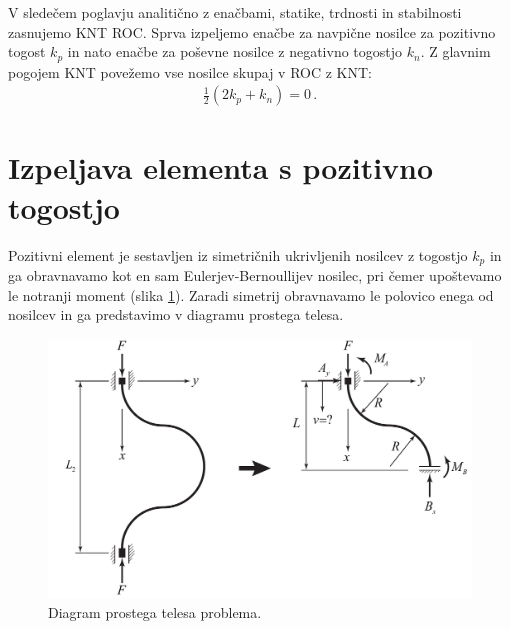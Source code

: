     V sledečem poglavju analitično z enačbami, statike, trdnosti in stabilnosti zasnujemo KNT ROC. Sprva izpeljemo enačbe za navpične nosilce za pozitivno togost $k_p$ in nato enačbe za poševne nosilce z negativno togostjo $k_n$. Z glavnim pogojem KNT  povežemo vse nosilce skupaj v ROC z KNT: 
    \begin{align}\label{eq:pogoh_KNT}
        \frac{1}{2} (2 k_p +  k_n) = 0 \,.
    \end{align}
    
    
    \newpage
    \section{Izpeljava elementa s pozitivno togostjo}\label{sec:Izpeljava_elementa_s_pozitivno_togostjo}
    
        Pozitivni element je sestavljen iz simetričnih ukrivljenih nosilcev z togostjo $k_p$ in ga obravnavamo kot en sam Eulerjev-Bernoullijev nosilec, pri čemer upoštevamo le notranji moment (slika \ref{fig:diagram prostega telesa pozitivni element}). Zaradi simetrij obravnavamo le polovico enega od nosilcev in ga predstavimo v diagramu prostega telesa.
        \begin{figure}[!hb]
                \centering
                \includegraphics[scale=0.32]{Magisterski praktikum/slike/teorija/pozitivni_nosilec_poenostavitev.pdf}
                \caption{Diagram prostega telesa problema.}\label{fig:diagram prostega telesa pozitivni element}
        \end{figure}
        
